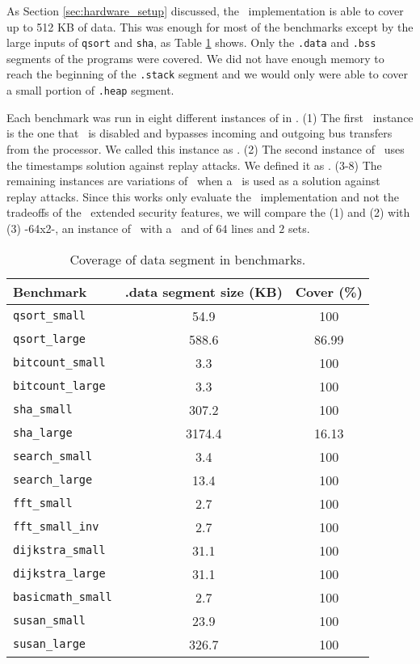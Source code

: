 As Section \ref{sec:hardware_setup} discussed, the \cshia~implementation is able to cover up to 512 KB of data. This was enough for most of the benchmarks except by the large inputs of \texttt{qsort} and \texttt{sha}, as Table \ref{tab:benchmarks} shows. Only the \texttt{.data} and \texttt{.bss} segments of the programs were covered. We did not have enough memory to reach the beginning of the \texttt{.stack} segment and we would only were able to cover a small portion of \texttt{.heap} segment.

Each benchmark was run in eight different instances of \cshia in \cite{caio}. (1) The first \cshia~instance is the one that \handler~is disabled and bypasses incoming and outgoing bus transfers from the processor. We called this instance as \baseline. (2) The second instance of \cshia~uses the timestamps solution against replay attacks. We defined it as \timestamp. (3-8) The remaining instances are variations of \cshia~when a \mt~is used as a solution against replay attacks. Since this works only evaluate the \cshia~implementation and not the tradeoffs of the \cshia~extended security features, we will compare the (1) and (2) with (3) \cshiamt-64x2-\lru , an instance of \cshia~with a \mt~and \ptagcache of $64$ lines and $2$ sets.

\begin{table}[t]
	\center
	\caption{Coverage of data segment in benchmarks.}
	\label{tab:benchmarks}
	\footnotesize
	\begin{tabular}{|l|c|c|}
		\hline
			Benchmark & .data segment size (KB) & Cover (\%)\\ 
		\hline
		\hline
			\texttt{qsort\_small}		&	54.9	&	100		\\
			\texttt{qsort\_large}		&	588.6	&	86.99	\\
			\texttt{bitcount\_small}	&	3.3		&	100		\\
			\texttt{bitcount\_large}	&	3.3		&	100		\\
			\texttt{sha\_small}			&	307.2	&	100		\\
			\texttt{sha\_large}			&	3174.4	&	16.13	\\
			\texttt{search\_small}		&	3.4		&	100		\\
			\texttt{search\_large}		&	13.4	&	100		\\
			\texttt{fft\_small}			&	2.7		&	100		\\
			\texttt{fft\_small\_inv}	&	2.7		&	100		\\
			\texttt{dijkstra\_small}	&	31.1	&	100		\\
			\texttt{dijkstra\_large}	&	31.1	&	100		\\
			\texttt{basicmath\_small}	&	2.7		&	100		\\
			\texttt{susan\_small}		&	23.9	&	100		\\
			\texttt{susan\_large}		&	326.7	&	100		\\
		\hline
	\end{tabular}
\end{table}

